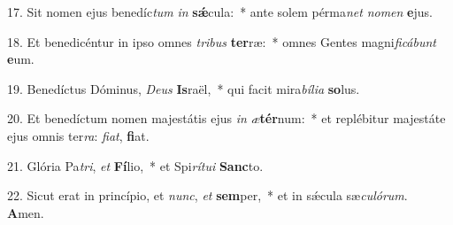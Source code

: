 17. Sit nomen ejus benedíc\textit{tum} \textit{in} \textbf{sǽ}cula:~*  ante solem pérma\textit{net} \textit{no}\textit{men} \textbf{e}jus.\

18. Et benedicéntur in ipso omnes \textit{tri}\textit{bus} \textbf{ter}ræ:~*  omnes Gentes magni\textit{fi}\textit{cá}\textit{bunt} \textbf{e}um.\

19. Benedíctus Dóminus, \textit{De}\textit{us} \textbf{Is}raël,~*  qui facit mira\textit{bí}\textit{li}\textit{a} \textbf{so}lus.\

20. Et benedíctum nomen majestátis ejus \textit{in} \textit{æ}\textbf{tér}num:~*  et replébitur majestáte ejus omnis ter\textit{ra}: \textit{fi}\textit{at}, \textbf{fi}at.\

21. Glória Pa\textit{tri}, \textit{et} \textbf{Fí}lio,~*  et Spi\textit{rí}\textit{tu}\textit{i} \textbf{Sanc}to.\

22. Sicut erat in princípio, et \textit{nunc}, \textit{et} \textbf{sem}per,~*  et in sǽcula sæ\textit{cu}\textit{ló}\textit{rum}. \textbf{A}men.\

